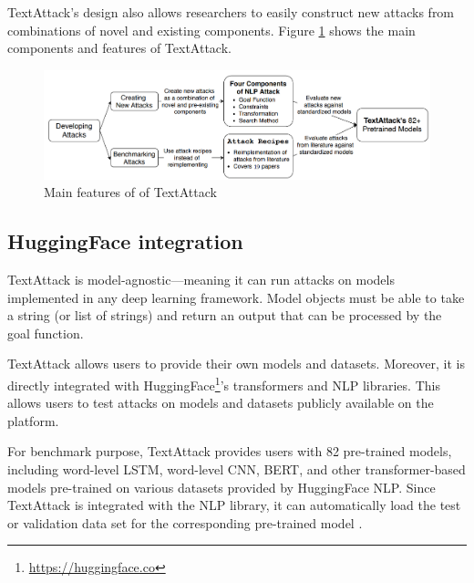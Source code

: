 TextAttack's design also allows researchers to easily construct new attacks from combinations of novel and existing components.
Figure \ref{fig:2_4_textattack} shows the main components and features of TextAttack.

\begin{figure}[h]
    \centering
    \includegraphics[width=0.9\linewidth]{images/2_4_textattack.png}
    \caption{Main features of of TextAttack}
    \label{fig:2_4_textattack}
\end{figure}

\subsection{HuggingFace integration}\label{subsec:huggingface-integration}

TextAttack is model-agnostic---meaning it
can run attacks on models implemented in any deep learning framework. Model objects must be able to take a string (or list of strings) and return an output that can be processed by the goal function.

TextAttack allows users to provide their own models and datasets. Moreover, it is directly integrated with HuggingFace\footnote{\url{https://huggingface.co}}'s transformers and NLP libraries. This allows users to test attacks on models and datasets publicly available on the platform. 

For benchmark purpose, TextAttack
provides users with 82 pre-trained models, including word-level LSTM, word-level CNN, BERT, and other transformer-based models pre-trained on various datasets provided by HuggingFace NLP. Since TextAttack is integrated with the NLP library, it can automatically load the test or validation data set for the corresponding pre-trained model \cite{journals/corr/abs-2005-05909}. 
